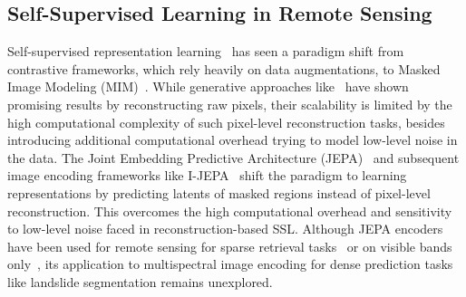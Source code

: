 \subsection{Self-Supervised Learning in Remote Sensing}
\label{sec:relwork-ssl}

Self-supervised representation learning~\cite{DBLP:journals/corr/abs-2002-05709} has seen a paradigm shift from contrastive frameworks, which rely heavily on data augmentations, to Masked Image Modeling (MIM)~\cite{hondru2025maskedimagemodelingsurvey}. While generative approaches like~\cite{he2022masked,astruc2024omnisat} have shown promising results by reconstructing raw pixels, their scalability is limited by the high computational complexity of such pixel-level reconstruction tasks, besides introducing additional computational overhead trying to model low-level noise in the data. The Joint Embedding Predictive Architecture (JEPA)~\cite{lecun2022path} and subsequent image encoding frameworks like I-JEPA~\cite{assran2023selfsupervisedlearningimagesjointembedding} shift the paradigm to learning representations by predicting latents of masked regions instead of pixel-level reconstruction. This overcomes the high computational overhead and sensitivity to low-level noise faced in reconstruction-based SSL. Although JEPA encoders have been used for remote sensing for sparse retrieval tasks~\cite{choudhury2025rejepa,Junghare2026} or on visible bands only~\cite{komurcu2026sat}, its application to multispectral image encoding for dense prediction tasks like landslide segmentation remains unexplored.

